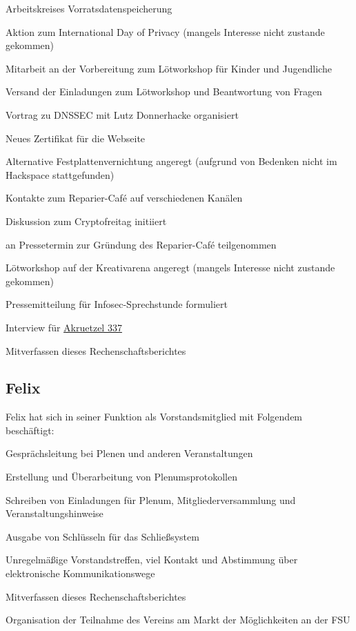 \documentclass[ngerman]{scrartcl}
\begin{document}
\begin{compactitem}
  Arbeitskreises Vorratsdatenspeicherung
\item Aktion zum International Day of Privacy (mangels Interesse nicht
  zustande gekommen)
\item Mitarbeit an der Vorbereitung zum Lötworkshop für Kinder und
  Jugendliche
\item Versand der Einladungen zum Lötworkshop und Beantwortung von
  Fragen
\item Vortrag zu DNSSEC mit Lutz Donnerhacke organisiert
\item Neues Zertifikat für die Webseite
\item Alternative Festplattenvernichtung angeregt (aufgrund von
  Bedenken nicht im Hackspace stattgefunden)
\item Kontakte zum Reparier-Café auf verschiedenen Kanälen
\item Diskussion zum Cryptofreitag initiiert
\item an Pressetermin zur Gründung des Reparier-Café teilgenommen
\item Lötworkshop auf der Kreativarena angeregt (mangels Interesse
  nicht zustande gekommen)
\item Pressemitteilung für Infosec-Sprechstunde formuliert
\item Interview für \href{https://www.akruetzel.de/wp-content/uploads/337-Finale-Version.pdf}{Akruetzel 337}
    \item Mitverfassen dieses Rechenschaftsberichtes
\end{compactitem}

\subsection{Felix}

Felix hat sich in seiner Funktion als Vorstandsmitglied mit Folgendem 
beschäftigt:

\begin{compactitem}
    \item Gesprächsleitung bei Plenen und anderen Veranstaltungen
    \item Erstellung und Überarbeitung von Plenumsprotokollen
    \item Schreiben von Einladungen für Plenum, Mitgliederversammlung und 
        Veranstaltungshinweise
    \item Ausgabe von Schlüsseln für das Schließsystem
    \item Unregelmäßige Vorstandstreffen, viel Kontakt und Abstimmung über 
        elektronische Kommunikationswege
    \item Mitverfassen dieses Rechenschaftsberichtes
    \item Organisation der Teilnahme des Vereins am Markt der Möglichkeiten an der FSU
\end{compactitem}
\end{document}
